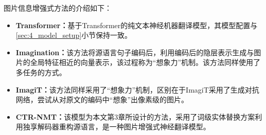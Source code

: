图片信息增强式方法的介绍如下：
\begin{itemize}
\item \textbf{Transformer：}基于Transformer的纯文本神经机器翻译模型，其模型配置与\ref{sec:4_model_setup}小节保持一致。
\item \textbf{Imagination\cite{37_elliott-kadar-2017-imagination}：}该方法将源语言句子编码后，利用编码后的隐层表示生成与图片的全局特征相近的向量表示，该过程称为“想象力”机制。该方法同样使用了多任务的方式。
\item \textbf{ImagiT\cite{51_long-etal-2021-generative}：}该方法同样采用了“想象力”机制，区别在于ImagiT采用了生成对抗网络，尝试从对原文的编码中“想象”出像素级的图片。
\item \textbf{CTR-NMT：}该模型为本文第3章所设计的方法，采用了词级实体替换方案利用独享解码器重构源语言，是一种图片增强式神经翻译模型。
\end{itemize}